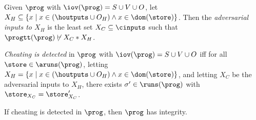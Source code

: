 \begin{definition}
  Given $\prog$ with $\iov(\prog) = S \cup V \cup O$,
  let $X_H \subseteq \{ x \mid x \in (\houtputs \cup O_H) \wedge x \in \dom(\store) \}$.
  Then the \emph{adversarial inputs to $X_H$} is the least set
  $X_C \subseteq \cinputs$ such that $\progtt(\prog) \not\vdash X_C * X_H$.
\end{definition}
\begin{definition}
  \emph{Cheating is detected} in $\prog$ with $\iov(\prog) = S \cup V \cup O$ iff
  for all  $\store \in \aruns(\prog)$,
  letting $X_H = \{ x \mid x \in (\houtputs \cup O_H) \wedge x \in \dom(\store) \}$,
  and letting $X_C$ be the adversarial inputs to $X_H$,
  there exists $\sigma'\in \runs(\prog)$
  with $\store_{X_C} = \store'_{X_C}$.  
\end{definition}

\begin{lemma}
  If cheating is detected in $\prog$, then $\prog$ has integrity.
\end{lemma}
